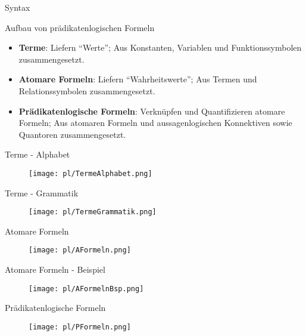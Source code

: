 \begin{frame}{Syntax}
	\begin{block}{Aufbau von prädikatenlogischen Formeln}
	\begin{itemize}[<+->]
		\item \textbf{Terme}: Liefern \enquote{Werte}; Aus Konstanten, Variablen und Funktionssymbolen zusammengesetzt.
		\item \textbf{Atomare Formeln}: Liefern \enquote{Wahrheitswerte}; Aus Termen und Relationssymbolen zusammengesetzt.
		\item \textbf{Prädikatenlogische Formeln}: Verknüpfen und Quantifizieren atomare Formeln; Aus atomaren Formeln und aussagenlogischen Konnektiven sowie Quantoren zusammengesetzt. 
	\end{itemize}
	\end{block}
\end{frame}


\begin{frame}{Terme - Alphabet}
\begin{figure}
	\centering
	\texttt{[image: pl/TermeAlphabet.png]} \hspace{2em} 
\end{figure} 
\end{frame}

\begin{frame}{Terme - Grammatik}
\begin{figure}[h!]
	\centering
	\texttt{[image: pl/TermeGrammatik.png]} \hspace{2em} 
\end{figure} 
\end{frame}

\begin{frame}{Atomare Formeln}
\begin{figure}[h!]
	\centering
	\texttt{[image: pl/AFormeln.png]} \hspace{2em} 
\end{figure} 
\end{frame}

\begin{frame}{Atomare Formeln - Beispiel}
\begin{figure}[h!]
	\centering
	\texttt{[image: pl/AFormelnBsp.png]} \hspace{2em} 
\end{figure} 
\end{frame}

\begin{frame}{Prädikatenlogische Formeln}
\begin{figure}[h!]
	\centering
	\texttt{[image: pl/PFormeln.png]} \hspace{2em} 
\end{figure} 
\end{frame}


